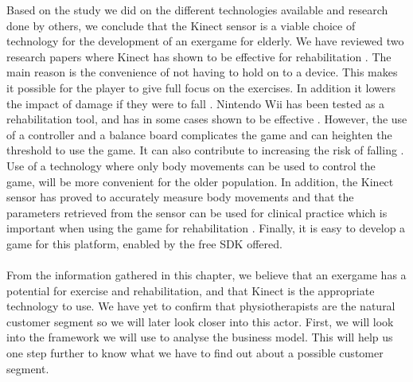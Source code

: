 Based on the study we did on the different technologies available and research done by others, we conclude that the Kinect sensor is a viable choice of technology for the development of an exergame for elderly. We have reviewed two research papers where Kinect has shown to be effective for rehabilitation \cite{kinect} \cite{garcia2012exergames}. The main reason is the convenience of not having to hold on to a device. This makes it possible for the player to give full focus on the exercises. In addition it lowers the impact of damage if they were to fall \cite{garcia2012exergames}. Nintendo Wii has been tested as a rehabilitation tool, and has in some cases shown to be effective \cite{taylor2011activity} \cite{excell}. However, the use of a controller and a balance board complicates the game and can heighten the threshold to use the game. It can also contribute to increasing the risk of falling \cite{exergamesforelderly}. Use of a technology where only body movements can be used to control the game, will be more convenient for the older population. In addition, the Kinect sensor has proved to accurately measure body movements and that the parameters retrieved from the sensor can be used for clinical practice which is important when using the game for rehabilitation  \cite{garcia2012exergames}. Finally,  it is easy to develop a game for this platform, enabled by the free SDK offered.\\ \\
From the information gathered in this chapter, we believe that an exergame has a potential for exercise and rehabilitation, and that Kinect is the appropriate technology to use. We have yet to confirm that physiotherapists are the natural customer segment so we will later look closer into this actor. First, we will look into the framework we will use to analyse the business model. This will help us one step further to know what we have to find out about a possible customer segment.




